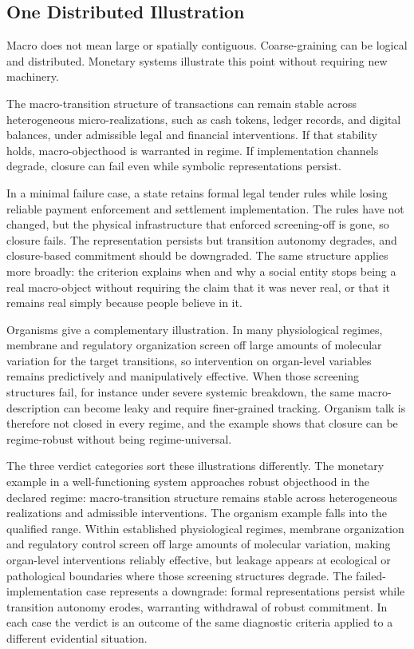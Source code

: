 \subsection{One Distributed
	Illustration}\label{one-distributed-illustration}

Macro does not mean large or spatially contiguous. Coarse-graining can
be logical and distributed. Monetary systems illustrate this point
without requiring new machinery.

The macro-transition structure of transactions can remain stable across
heterogeneous micro-realizations, such as cash tokens, ledger records,
and digital balances, under admissible legal and financial
interventions. If that stability holds, macro-objecthood is warranted in
regime. If implementation channels degrade, closure can fail even while
symbolic representations persist.

In a minimal failure case, a state retains formal legal tender rules
while losing reliable payment enforcement and settlement implementation.
The rules have not changed, but the physical infrastructure that
enforced screening-off is gone, so closure fails. The representation
persists but transition autonomy degrades, and closure-based commitment
should be downgraded. The same structure applies more broadly: the
criterion explains when and why a social entity stops being a real
macro-object without requiring the claim that it was never real, or that
it remains real simply because people believe in it.

Organisms give a complementary illustration. In many physiological
regimes, membrane and regulatory organization screen off large amounts of
molecular variation for the target transitions, so intervention on
organ-level variables remains predictively and manipulatively effective.
When those screening structures fail, for instance under severe systemic
breakdown, the same macro-description can become leaky and require
finer-grained tracking. Organism talk is therefore not closed in every
regime, and the example shows that closure can be regime-robust without
being regime-universal.

The three verdict categories sort these illustrations differently. The
monetary example in a well-functioning system
approaches robust objecthood in the declared regime: macro-transition
structure remains stable across heterogeneous realizations and admissible
interventions. The organism example falls into the qualified range.
Within established physiological regimes, membrane organization and
regulatory control screen off large amounts of molecular variation,
making organ-level interventions reliably effective, but leakage appears
at ecological or pathological boundaries where those screening structures
degrade. The failed-implementation case
represents a downgrade: formal representations persist while transition
autonomy erodes, warranting withdrawal of robust commitment. In each case
the verdict is an outcome of the same diagnostic criteria applied to a
different evidential situation.


